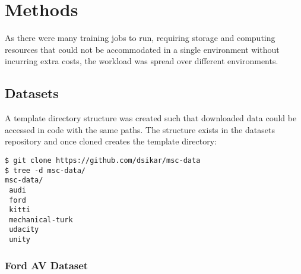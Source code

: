 
\chapter{Methods} %

\label{AppendixA} %

As there were many training jobs to run, requiring storage and computing resources that could not be accommodated in a single environment without incurring extra costs, the workload was spread over different environments.

\section{Datasets}

A template directory structure was created such that downloaded data could be accessed in code with the same paths. The structure exists in the datasets repository and once cloned creates the template directory:
\begin{verbatim}
$ git clone https://github.com/dsikar/msc-data
$ tree -d msc-data/
msc-data/
 audi
 ford
 kitti
 mechanical-turk
 udacity
 unity
\end{verbatim}

\subsection{Ford AV Dataset}

